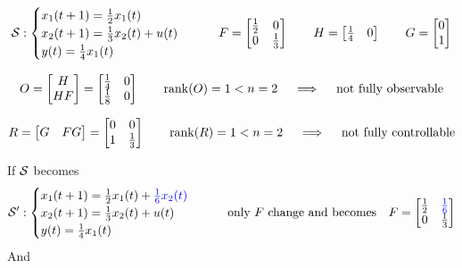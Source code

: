 \begin{exa}[SISO system of order $n=2$]
    \begin{align*}
    \mathcal{S}: 
        \begin{cases}
            x_1(t+1) = \frac{1}{2} x_1(t)\\
            x_2(t+1) = \frac{1}{3}x_2(t) + u(t)\\
            y(t) = \frac{1}{4}x_1(t)
        \end{cases}
        \qquad
        F = \begin{bmatrix}
            \frac{1}{2} & 0\\
            0 & \frac{1}{3}
        \end{bmatrix}
        \qquad
        H = \begin{bmatrix}
            \frac{1}{4} & 0
        \end{bmatrix}
        \qquad
        G = \begin{bmatrix}
            0 \\
            1
        \end{bmatrix}
    \end{align*}

    \[
        O = \begin{bmatrix}
            H \\
            HF
        \end{bmatrix} = \begin{bmatrix}
            \frac{1}{4} & 0 \\
            \frac{1}{8} & 0
        \end{bmatrix}
        \qquad
        \operatorname*{rank} (O) = 1 < n = 2
        \quad\implies\quad \text{not fully observable}
    \]

    \[
        R = \begin{bmatrix}
            G & FG
        \end{bmatrix} = \begin{bmatrix}
            0 & 0 \\
            1 & \frac{1}{3}
        \end{bmatrix}
        \qquad
        \operatorname*{rank} (R) = 1 < n = 2
        \quad\implies\quad \text{not fully controllable}
    \]
    
    If $\mathcal{S}$ becomes 
    \begin{align*}
    \mathcal{S'}: 
        \begin{cases}
            x_1(t+1) = \frac{1}{2} x_1(t) + \color{blue} \frac{1}{6} x_2(t)\\
            x_2(t+1) = \frac{1}{3}x_2(t) + u(t)\\
            y(t) = \frac{1}{4}x_1(t)
        \end{cases}
        \qquad
        \text{only $F$ change and becomes}\quad
        F = \begin{bmatrix}
            \frac{1}{2} & \color{blue} \frac{1}{6} \\
            0 & \frac{1}{3}
        \end{bmatrix}
    \end{align*} 
    And  
    

\end{exa}
